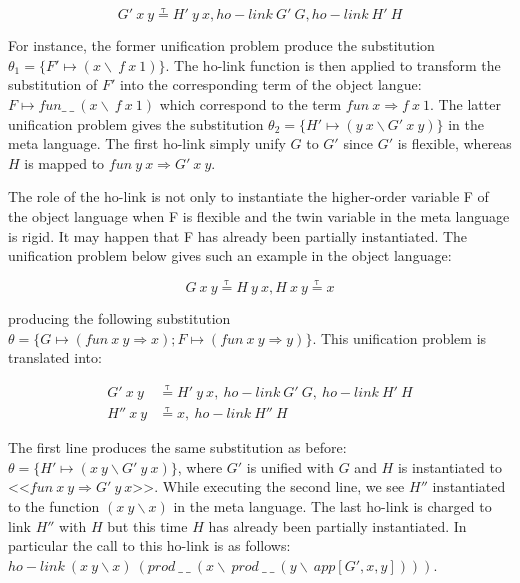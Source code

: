 \documentclass[acmengage]{acmart}
\newcommand*{\eqtau}{\ensuremath{\mathrel{\overset{\mathrm{\tau}}{=}}}}
\begin{document}
\begin{equation}
  G'\ x\ y \eqtau H'\ y\ x, ho-link\ G'\ G, ho-link\ H'\ H
  \label{eq:unif-ho-elpi2'}
\end{equation}

For instance, the former unification problem produce the substitution $\theta_1
= \{F' \mapsto (x\backslash\ f\ x\ 1)\}$. The ho-link function is then applied
to transform the substitution of $F'$ into the corresponding term of the object
langue: $F \mapsto fun \_\ \_\ (x\backslash\ f\ x\ 1)$ which correspond to the
term $fun\ x \Rightarrow f\ x\ 1$. The latter unification problem gives the
substitution $\theta_2 = \{H' \mapsto (y\ x \backslash G'\ x\ y)\}$ in the
meta language. The first ho-link simply unify $G$ to $G'$ since $G'$ is
flexible, whereas $H$ is mapped to $fun\ y\ x \Rightarrow G'\ x\ y$.

The role of the ho-link is not only to instantiate the higher-order variable F
of the object language when F is flexible and the twin variable in the meta
language is rigid. It may happen that F has already been partially instantiated.
The unification problem below gives such an example in the object language:

\begin{equation}
  G\ x\ y \eqtau H\ y\ x, H\ x\ y \eqtau x 
  \label{eq:unif-ho-coq4}
\end{equation}

\noindent producing the following substitution $\theta = \{G \mapsto (fun\ x\
y\Rightarrow x); F \mapsto (fun\ x\ y\Rightarrow y)\}$. This unification problem
is translated into:

\begin{equation}
  \begin{split}
    G'\ x\ y &\eqtau H'\ y\ x,\ ho-link\ G'\ G,\ ho-link\ H'\ H\\
    H''\ x\ y &\eqtau x,\ ho-link\ H''\ H
  \end{split}
  \label{eq:unif-ho-elpi4}
\end{equation}

\noindent The first line produces the same substitution as before: $\theta = \{H'
\mapsto (x\ y \backslash G'\ y\ x)\}$, where $G'$ is unified with $G$ and $H$ is
instantiated to <<$fun\ x\ y \Rightarrow G'\ y\ x$>>. While executing the second
line, we see $H''$ instantiated to the function $(x\ y\backslash x)$ in the
meta language. The last ho-link is charged to link $H''$ with $H$ but this
time $H$ has already been partially instantiated. In particular the call to this
ho-link is as follows: $ho-link\ (x\ y\backslash x)\
(prod\ \_\ \_\ (x\backslash\ prod\ \_\ \_\ (y\backslash\ app [G', x, y])))$.
\end{document}
